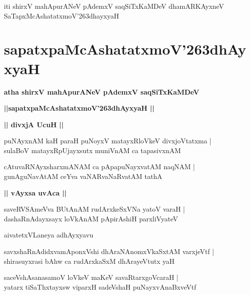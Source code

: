 \documentclass[twoside,12pt,openright]{book}
\def\S{\char'263}
\newcounter{shloka}[chapter]
\def\uvaca#1{\centerline{{\large\textbf{#1}}}}
\begin{document}
\begin{center}
iti shirxV mahApurANeV pAdemxV saqSiTxKaMDeV dhamARKAyxneV SaTapxMcAshatatxmoV\S dhayxyaH
\end{center}

\chapter{sapatxpaMcAshatatxmoV\S dhAyxyaH}

\begin{center}
{\LARGE\bfseries atha shirxV mahApurANeV pAdemxV saqSiTxKaMDeV}
\end{center}

\begin{center}
{\LARGE\bfseries ||sapatxpaMcAshatatxmoV\S dhAyxyaH || }
\end{center}

\uvaca{|| divxjA UcuH ||}

\begin{shloka}%
puNAyxnAM kaH paraH puNoyxV matayxRloVkeV divxjoVtatxma |\\
sulaBoV matayxRpUjayxsutx muniVnAM ca tapasivxnAM 
\end{shloka}

\begin{shloka}%
cAtuvaRNAyxsharxmANAM ca pApapuNayxvatAM naqNAM |\\
gunAguNavAtAM ceYva vaNARvaNaRvatAM tathA 
\end{shloka}

\uvaca{|| vAyxsa uvAca ||}

\begin{shloka}%
saveRVSAmeVva BUtAnAM rudArxkeSxVNa yatoV varaH |\\
dashaRnAdayxsayx loVkAnAM pApirAshiH parxliVyateV 
\end{shloka}

\begin{center}
aivatetxVLaneya adhAyxyavu
\end{center}

\begin{shloka}%
savxshaRnAdidxvamAponxVshi dhAraNAnomxVkaSxtAM varxjeVtf |\\
shirasuyxrasi bAhw ca rudArxkaSxM dhArayeVtutx yaH 
\end{shloka}

\begin{shloka}%
saceVshAsanasamoV loVkeV maKeV savaRtarxgoVcaraH |\\
yatarx tiSaThxtayxsw viparxH sadeVshaH puNayxvAnaBxveVtf 
\end{shloka}
\end{document}
